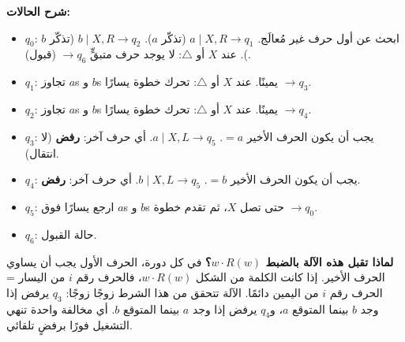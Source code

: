 \documentclass[14pt]{extarticle}
\begin{document}
\medskip
\textbf{شرح الحالات:}
\begin{itemize}
    \item $q_0$: ابحث عن أول حرف غير مُعالَج. $a \mid X, R \to q_1$ (تذكّر $a$). $b \mid X, R \to q_2$ (تذكّر $b$). عند $X$ أو $\triangle$: لا يوجد حرف متبقٍّ $\to q_6$ (قبول).
    \item $q_1$: تجاوز $a$s و $b$s يمينًا. عند $X$ أو $\triangle$: تحرك خطوة يسارًا $\to q_3$.
    \item $q_2$: تجاوز $a$s و $b$s يمينًا. عند $X$ أو $\triangle$: تحرك خطوة يسارًا $\to q_4$.
    \item $q_3$: يجب أن يكون الحرف الأخير $= a$. $a \mid X, L \to q_5$. أي حرف آخر: \textbf{رفض} (لا انتقال).
    \item $q_4$: يجب أن يكون الحرف الأخير $= b$. $b \mid X, L \to q_5$. أي حرف آخر: \textbf{رفض}.
    \item $q_5$: ارجع يسارًا فوق $a$s و $b$s حتى تصل $X$، ثم تقدم خطوة $\to q_0$.
    \item $q_6$: حالة القبول.
\end{itemize}

\begin{boxNote}
\textbf{لماذا تقبل هذه الآلة بالضبط $w \cdot R(w)$؟} في كل دورة، الحرف الأول يجب أن يساوي الحرف الأخير. إذا كانت الكلمة من الشكل $w \cdot R(w)$، فالحرف رقم $i$ من اليسار = الحرف رقم $i$ من اليمين دائمًا. الآلة تتحقق من هذا الشرط زوجًا زوجًا: $q_3$ يرفض إذا وجد $b$ بينما المتوقع $a$، و$q_4$ يرفض إذا وجد $a$ بينما المتوقع $b$. أي مخالفة واحدة تنهي التشغيل فورًا برفضٍ تلقائي.
\end{boxNote}
\end{document}
